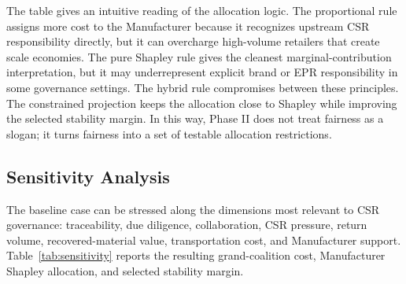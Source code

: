 The table gives an intuitive reading of the allocation logic. The proportional rule assigns more cost to the Manufacturer because it recognizes upstream CSR responsibility directly, but it can overcharge high-volume retailers that create scale economies. The pure Shapley rule gives the cleanest marginal-contribution interpretation, but it may underrepresent explicit brand or EPR responsibility in some governance settings. The hybrid rule compromises between these principles. The constrained projection keeps the allocation close to Shapley while improving the selected stability margin. In this way, Phase II does not treat fairness as a slogan; it turns fairness into a set of testable allocation restrictions.

\subsection{Sensitivity Analysis}

The baseline case can be stressed along the dimensions most relevant to CSR governance: traceability, due diligence, collaboration, CSR pressure, return volume, recovered-material value, transportation cost, and Manufacturer support. Table~\ref{tab:sensitivity} reports the resulting grand-coalition cost, Manufacturer Shapley allocation, and selected stability margin.

\begin{table}[htbp]
\centering
\caption{Sensitivity of Grand-Coalition Cost, Manufacturer Allocation, and Stability}
\label{tab:sensitivity}
\end{table}

